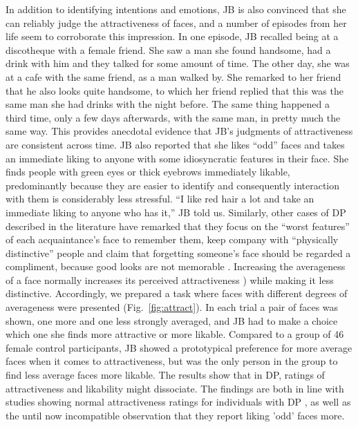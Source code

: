 \documentclass[fleqn,10pt]{SelfArx} %
\begin{document}
In addition to identifying intentions and emotions, JB is also convinced that she can reliably judge the attractiveness of faces, and a number of episodes from her life seem to corroborate this impression.
In one episode, JB recalled being at a discotheque with a female friend. She saw a man she found handsome, had a drink with him and they talked for some amount of time. The other day, she was at a cafe with the same friend, as a man walked by. She remarked to her friend that he also looks quite handsome, to which her friend replied that this was the same man she had drinks with the night before. The same thing happened a third time, only a few days afterwards, with the same man, in pretty much the same way. This provides anecdotal evidence that JB's judgments of attractiveness are consistent across time.
JB also reported that she likes “odd” faces and takes an immediate liking to anyone with some idiosyncratic features in their face. She finds people with green eyes or thick eyebrows immediately likable, predominantly because they are easier to identify and consequently interaction with them is considerably less stressful. “I like red hair a lot and take an immediate liking to anyone who has it,” JB told us. Similarly, other cases of DP described in the literature have remarked that they focus on the “worst features” of each acquaintance's face to remember them, keep company with “physically distinctive” people and claim that forgetting someone's face should be regarded a compliment, because good looks are not memorable \citep{Fine_2012}.
Increasing the averageness of a face normally increases its perceived attractiveness \citep{Little_2011}) while making it less distinctive. Accordingly, we prepared a task where faces with different degrees of averageness were presented (Fig.~\ref{fig:attract}). In each trial a pair of faces was shown, one more and one less strongly averaged, and JB had to make a choice which one she finds more attractive or more likable. Compared to a group of 46 female control participants, JB showed a prototypical preference for more average faces when it comes to attractiveness, but was the only person in the group to find less average faces more likable. The results show that in DP, ratings of attractiveness and likability might dissociate. The findings are both in line with studies showing normal attractiveness ratings for individuals with DP \citep{Carbon_2010}, as well as the until now incompatible observation that they report liking 'odd' faces more.
\end{document}
